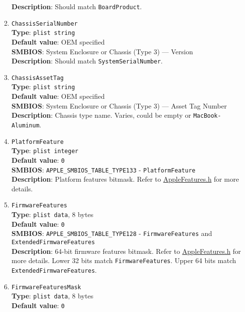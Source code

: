 \documentclass[]{article}
\begin{document}
\begin{enumerate}
  \textbf{Description}: Should match \texttt{BoardProduct}.
\item
  \texttt{ChassisSerialNumber}\\
  \textbf{Type}: \texttt{plist\ string}\\
  \textbf{Default value}: OEM specified\\
  \textbf{SMBIOS}: System Enclosure or Chassis (Type 3) --- Version\\
  \textbf{Description}: Should match \texttt{SystemSerialNumber}.
\item
  \texttt{ChassisAssetTag}\\
  \textbf{Type}: \texttt{plist\ string}\\
  \textbf{Default value}: OEM specified\\
  \textbf{SMBIOS}: System Enclosure or Chassis (Type 3) --- Asset Tag
  Number\\
  \textbf{Description}: Chassis type name. Varies, could be empty or
  \texttt{MacBook-Aluminum}.
\item
  \texttt{PlatformFeature}\\
  \textbf{Type}: \texttt{plist\ integer}\\
  \textbf{Default value}: \texttt{0}\\
  \textbf{SMBIOS}: \texttt{APPLE\_SMBIOS\_TABLE\_TYPE133} -
  \texttt{PlatformFeature}\\
  \textbf{Description}: Platform features bitmask. Refer to
  \href{https://github.com/acidanthera/EfiPkg/blob/master/Include/IndustryStandard/AppleFeatures.h}{AppleFeatures.h}
  for more details.
\item
  \texttt{FirmwareFeatures}\\
  \textbf{Type}: \texttt{plist\ data}, 8 bytes\\
  \textbf{Default value}: \texttt{0}\\
  \textbf{SMBIOS}: \texttt{APPLE\_SMBIOS\_TABLE\_TYPE128} -
  \texttt{FirmwareFeatures} and \texttt{ExtendedFirmwareFeatures}\\
  \textbf{Description}: 64-bit firmware features bitmask. Refer to
  \href{https://github.com/acidanthera/EfiPkg/blob/master/Include/IndustryStandard/AppleFeatures.h}{AppleFeatures.h}
  for more details. Lower 32 bits match \texttt{FirmwareFeatures}. Upper
  64 bits match \texttt{ExtendedFirmwareFeatures}.
\item
  \texttt{FirmwareFeaturesMask}\\
  \textbf{Type}: \texttt{plist\ data}, 8 bytes\\
  \textbf{Default value}: \texttt{0}\\

\end{enumerate}
\end{document}
